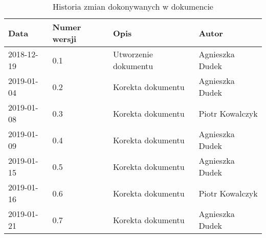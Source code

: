 \documentclass{article}
\begin{document}
\begin{titlepage}







\end{titlepage}

\addtocounter{page}{1}
\newpage

\begin{table}[h!]
	\begin{center}
		\caption{Historia zmian dokonywanych w dokumencie}
		\begin{tabular}{|l|l|l|l|}
			\hline
			Data & Numer wersji & Opis & Autor \\
			\hline \hline
			2018-12-19 & 0.1 & Utworzenie dokumentu & Agnieszka Dudek \\
			\hline
			2019-01-04 & 0.2 & Korekta dokumentu & Agnieszka Dudek \\
			\hline
			2019-01-08 & 0.3 & Korekta dokumentu & Piotr Kowalczyk \\
			\hline 
			2019-01-09 & 0.4 & Korekta dokumentu & Agnieszka Dudek \\
			\hline 
			2019-01-15 & 0.5 & Korekta dokumentu & Agnieszka Dudek \\
			\hline 
			2019-01-16 & 0.6 & Korekta dokumentu & Piotr Kowalczyk \\
			\hline 
			2019-01-21 & 0.7 & Korekta dokumentu & Agnieszka Dudek \\
			\hline 


    \end{tabular}
	\end{center}
\end{table}	
\end{document}
